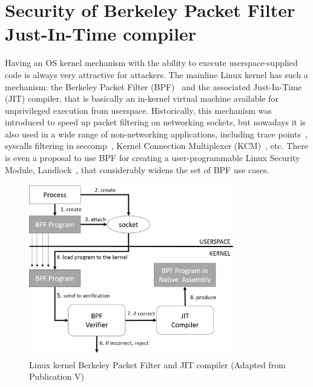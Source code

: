 \section{Security of Berkeley Packet Filter Just-In-Time compiler}
\label{sec:bpf-jit-attack}

Having an OS kernel mechanism with the ability to execute userspace-supplied code is always very attractive for attackers. 
The mainline Linux kernel has such a mechanism: the Berkeley Packet Filter (BPF)~\cite{kernelfilter2016} and the associated Just-In-Time (JIT) compiler, that is basically an in-kernel virtual machine available for unprivileged execution from userspace. Historically, this mechanism was introduced to speed up packet filtering on networking sockets, but nowadays it is also used in a wide range of non-networking applications, including trace points~\cite{starovoitov2015}, syscalls filtering in seccomp~\cite{seccomp2016}, Kernel Connection Multiplexer (KCM)~\cite{corbet2015}, etc. There is even a proposal to use BPF for creating a user-programmable Linux Security Module, Landlock~\cite{landlock2016}, that considerably widens the set of BPF use cases.

\begin{figure}[t]
	\centering
		\includegraphics[width=0.80\textwidth]{figures/bpf-overview.png}
	\caption{Linux kernel Berkeley Packet Filter and JIT compiler (Adapted from Publication V)}
	\label{fig:bpf-overview}
\end{figure}


